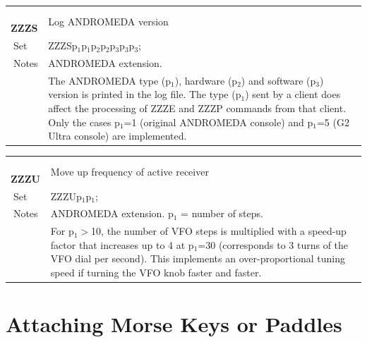 \documentclass[12pt]{book}
\begin{document}
\begin{center}
\begin{tabular}{|p{2cm}|p{11cm}|}
\toprule
$\phantom{\Big|}$\textbf{\large ZZZS} & Log ANDROMEDA version \\\cline{1-2}
$\phantom{\Big|}${\large Set} & {ZZZSp$_1$p$_1$p$_2$p$_2$p$_3$p$_3$p$_3$;} \\\hline
$\phantom{\Big|}${\large Notes} & \multicolumn{1}{|p{11cm}|}{ANDROMEDA extension.} \\
 & \multicolumn{1}{|p{11cm}|}{The ANDROMEDA type (p$_1$), hardware (p$_2$) and software (p$_3$) version is printed in the log file. The type (p$_1$) sent by a client does affect the processing of ZZZE and ZZZP commands from that client. Only the cases p$_1$=1 (original ANDROMEDA console) and p$_1$=5 (G2 Ultra console) are implemented.} \\
\bottomrule
\end{tabular}
\end{center}

\begin{center}
\begin{tabular}{|p{2cm}|p{11cm}|}
\toprule
$\phantom{\Big|}$\textbf{\large ZZZU} & Move up frequency of active receiver \\\cline{1-2}
$\phantom{\Big|}${\large Set} & {ZZZUp$_1$p$_1$;} \\\hline
$\phantom{\Big|}${\large Notes} & \multicolumn{1}{|p{11cm}|}{ANDROMEDA extension. p$_1$ = number of steps.} \\
 & \multicolumn{1}{|p{11cm}|}{For p$_1$$>$10, the number of VFO steps is multiplied with a speed-up factor that increases up to 4 at p$_1$=30 (corresponds to 3 turns of the VFO dial per second). This implements an over-proportional tuning speed if turning the VFO knob faster and faster.} \\
\bottomrule
\end{tabular}
\end{center}



\chapter[Connecting a Morse Key]{Attaching Morse Keys or Paddles}
\label{sec:ConnectCW}
\end{document}
